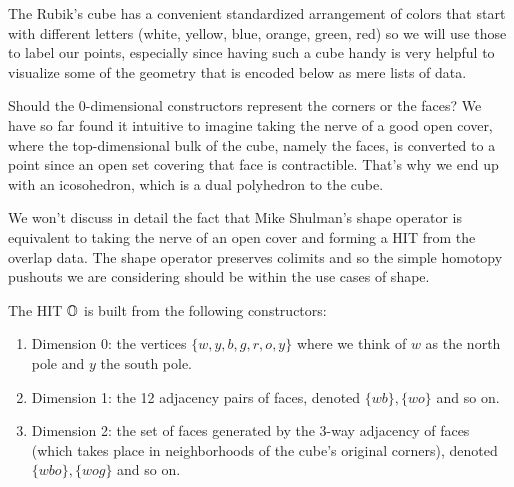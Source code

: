 \documentclass[12pt]{article}
\begin{document}
The Rubik's cube has a convenient standardized arrangement of colors that start with different letters (white, yellow, blue, orange, green, red) so we will use those to label our points, especially since having such a cube handy is very helpful to visualize some of the geometry that is encoded below as mere lists of data.

Should the 0-dimensional constructors represent the corners or the faces? We have so far found it intuitive to imagine taking the nerve of a good open cover, where the top-dimensional bulk of the cube, namely the faces, is converted to a point since an open set covering that face is contractible. That's why we end up with an icosohedron, which is a dual polyhedron to the cube.

We won't discuss in detail the fact that Mike Shulman's shape operator \cite{shulman_cohesion} is equivalent to taking the nerve of an open cover and forming a HIT from the overlap data. The shape operator preserves colimits and so the simple homotopy pushouts we are considering should be within the use cases of shape.

The HIT \( \mathbb{O} \) is built from the following constructors:
\begin{enumerate}
\item Dimension 0: the vertices \( \{w, y, b, g, r, o, y\} \) where we think of \( w \) as the north pole and \( y \) the south pole.
\item Dimension 1: the 12 adjacency pairs of faces, denoted \( \{wb\}, \{wo\}  \) and so on.
\item Dimension 2: the set of faces generated by the 3-way adjacency of faces (which takes place in neighborhoods of the cube's original corners), denoted \( \{wbo\}, \{wog\} \) and so on.
\end{enumerate}
\end{document}
